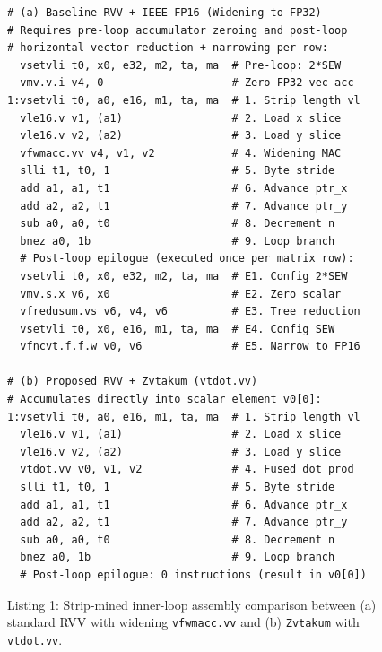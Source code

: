 \documentclass[conference]{IEEEtran}
\begin{document}
\begin{figure}[htbp]
\footnotesize
\begin{verbatim}
# (a) Baseline RVV + IEEE FP16 (Widening to FP32)
# Requires pre-loop accumulator zeroing and post-loop
# horizontal vector reduction + narrowing per row:
  vsetvli t0, x0, e32, m2, ta, ma  # Pre-loop: 2*SEW
  vmv.v.i v4, 0                    # Zero FP32 vec acc
1:vsetvli t0, a0, e16, m1, ta, ma  # 1. Strip length vl
  vle16.v v1, (a1)                 # 2. Load x slice
  vle16.v v2, (a2)                 # 3. Load y slice
  vfwmacc.vv v4, v1, v2            # 4. Widening MAC
  slli t1, t0, 1                   # 5. Byte stride
  add a1, a1, t1                   # 6. Advance ptr_x
  add a2, a2, t1                   # 7. Advance ptr_y
  sub a0, a0, t0                   # 8. Decrement n
  bnez a0, 1b                      # 9. Loop branch
  # Post-loop epilogue (executed once per matrix row):
  vsetvli t0, x0, e32, m2, ta, ma  # E1. Config 2*SEW
  vmv.s.x v6, x0                   # E2. Zero scalar
  vfredusum.vs v6, v4, v6          # E3. Tree reduction
  vsetvli t0, x0, e16, m1, ta, ma  # E4. Config SEW
  vfncvt.f.f.w v0, v6              # E5. Narrow to FP16

# (b) Proposed RVV + Zvtakum (vtdot.vv)
# Accumulates directly into scalar element v0[0]:
1:vsetvli t0, a0, e16, m1, ta, ma  # 1. Strip length vl
  vle16.v v1, (a1)                 # 2. Load x slice
  vle16.v v2, (a2)                 # 3. Load y slice
  vtdot.vv v0, v1, v2              # 4. Fused dot prod
  slli t1, t0, 1                   # 5. Byte stride
  add a1, a1, t1                   # 6. Advance ptr_x
  add a2, a2, t1                   # 7. Advance ptr_y
  sub a0, a0, t0                   # 8. Decrement n
  bnez a0, 1b                      # 9. Loop branch
  # Post-loop epilogue: 0 instructions (result in v0[0])
\end{verbatim}
\caption{Listing 1: Strip-mined inner-loop assembly comparison between (a) standard RVV with widening \texttt{vfwmacc.vv} and (b) \texttt{Zvtakum} with \texttt{vtdot.vv}.}
\label{fig:asm_loops}
\end{figure}
\end{document}
